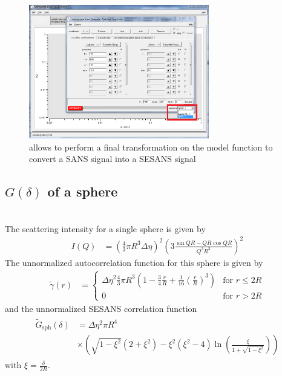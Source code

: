 \begin{figure}[htb]
\begin{center}
\includegraphics[width=0.7\textwidth]{../images/GUI/HankelOperator.png}
\end{center}
\caption{\SASfit allows to perform a final transformation on the model function to convert a SANS signal into a SESANS signal}
\label{fig:HankelOp}
\end{figure}


\subsection{$G(\delta)$ of a sphere} ~\\
\label{sec:Gz_sphere}
The scattering intensity for a single sphere is given by
\begin{align}
I(Q) &= \left(\frac{4}{3}\pi R^3 \Delta\eta\right)^2 \left(3\frac{\sin QR-QR\cos QR}{Q^3R^3}\right)^2
\end{align}
The unnormalized autocorrelation function for this sphere is given by
\begin{align}
\tilde{\gamma}(r) &=
\begin{cases}
 \Delta\eta^2  \frac{4}{3}\pi R^3 \left( 1-\frac{3}{4}\frac{r}{R}+\frac{1}{16}\left(\frac{r}{R}\right)^3\right) & \mbox{for } r\leq 2R \\
0 & \mbox{for }  r>2R
\end{cases}
\end{align}
and the unnormalized SESANS correlation function
\begin{align}
\begin{split}
\tilde{G}_\mathrm{sph}(\delta)&= \Delta\eta^2 \pi R^4 \\
&\times \left(\sqrt{1-\xi^2}(2+\xi^2)-\xi^2(\xi^2-4)\ln\left(\frac{\xi}{1+\sqrt{1-\xi^2}}\right)\right)
\end{split}
\label{eq:Gz_sph}
\end{align}
with $\xi=\frac{\delta}{2R}$.



